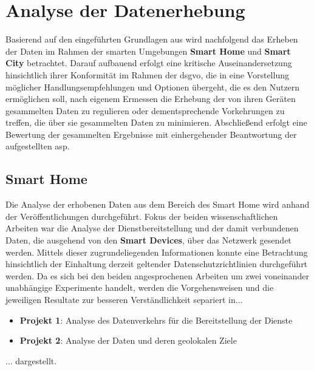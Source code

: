 
\section{Analyse der Datenerhebung}
\label{sec:Analyse der Datenerhebung}

Basierend auf den eingeführten Grundlagen aus  wird nachfolgend das Erheben der Daten im Rahmen der smarten Umgebungen \textbf{Smart Home} und \textbf{Smart City} betrachtet. Darauf aufbauend erfolgt eine kritische Auseinandersetzung hinsichtlich ihrer Konformität im Rahmen der \ac{dsgvo}, die in eine Vorstellung möglicher Handlungsempfehlungen und Optionen übergeht, 
die es den Nutzern ermöglichen soll, nach eigenem Ermessen die Erhebung der von ihren Geräten gesammelten Daten zu regulieren oder dementsprechende Vorkehrungen zu treffen, die über sie gesammelten Daten zu minimieren. 
Abschließend erfolgt eine Bewertung der gesammelten Ergebnisse mit einhergehender Beantwortung der aufgestellten \acl{asp}.

\subsection{Smart Home}
\label{sec:Analyse der Datenerhebung:ssec:Smart Home}

Die Analyse der erhobenen Daten aus dem Bereich des Smart Home wird anhand der Veröffentlichungen \cite{Mandalari2021,Ren2019} durchgeführt. Fokus der beiden wissenschaftlichen Arbeiten war die Analyse der Dienstbereitstellung und der damit verbundenen Daten, die ausgehend von den \textbf{Smart Devices}, über das Netzwerk gesendet werden. Mittels dieser zugrundeliegenden Informationen konnte eine Betrachtung hinsichtlich der Einhaltung derzeit geltender Datenschutzrichtlinien durchgeführt werden.
Da es sich bei den beiden angesprochenen Arbeiten um zwei voneinander unabhängige Experimente handelt, werden die Vorgehensweisen und die jeweiligen Resultate zur besseren Verständlichkeit separiert in...
\begin{itemize}
	\item \textbf{Projekt 1}: Analyse des Datenverkehrs für die Bereitstellung der Dienste
	\item \textbf{Projekt 2}: Analyse der Daten und deren geolokalen Ziele
\end{itemize}
\noindent ... dargestellt.

